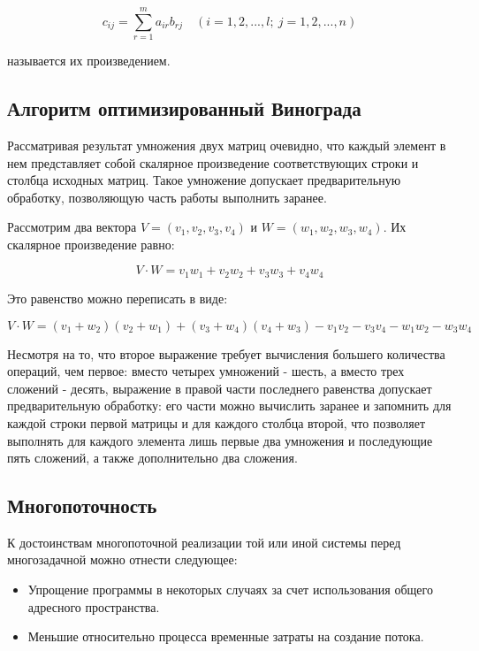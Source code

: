 \begin{equation}
    \label{eq:1.1}
    c_{ij} =
    \sum_{r=1}^{m} a_{ir} b_{rj} \quad (i=1,2,...,l; \ j=1,2,...,n)
\end{equation}

называется их произведением.

\pagebreak
\subsection{Алгоритм оптимизированный Винограда}

Рассматривая результат умножения двух матриц очевидно, что каждый элемент
в нем представляет собой скалярное произведение соответствующих строки и столбца исходных матриц.
Такое умножение допускает предварительную обработку,
позволяющую часть работы выполнить заранее.

Рассмотрим два вектора
$V = (v_1, v_2, v_3, v_4)$ и
$W = (w_1, w_2, w_3, w_4)$.
Их скалярное произведение равно:

\begin{equation}
    \label{eq:1.2}
    V \cdot W = v_1 w_1 + v_2 w_2 + v_3 w_3 + v_4 w_4
\end{equation}


Это равенство можно переписать в виде:

\begin{equation}
    \label{eq:1.2}
    V \cdot W = (v_1+w_2)(v_2+w_1)+(v_3+w_4)(v_4+w_3)-v_1v_2-v_3v_4-w_1w_2-w_3w_4
\end{equation}

Несмотря на то, что второе выражение требует вычисления большего
количества операций, чем первое: вместо четырех умножений - шесть,
а вместо трех сложений - десять, выражение в правой части последнего равенства
допускает предварительную обработку: его части можно вычислить заранее
и запомнить для каждой строки первой матрицы и для каждого столбца
второй, что позволяет выполнять для каждого элемента лишь первые два
умножения и последующие пять сложений, а также дополнительно два сложения.


\subsection{Многопоточность}

К достоинствам многопоточной реализации той или иной системы перед многозадачной можно отнести следующее:

\begin{itemize}
    \item Упрощение программы в некоторых случаях за счет использования общего адресного пространства.
    \item Меньшие относительно процесса временные затраты на создание потока.
\end{itemize}

